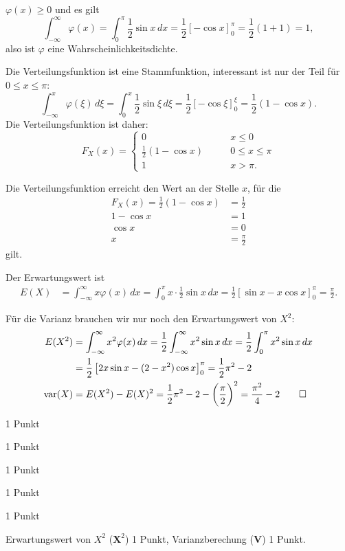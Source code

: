\begin{loesung}
\begin{teilaufgaben}
\item
$\varphi(x)\ge 0$ und es gilt
\[
\int_{-\infty}^\infty\varphi(x)=\int_0^\pi\frac12\sin x\,dx
=
\frac12\left[-\cos x\right]_0^\pi=\frac12(1+1)=1,
\]
also ist $\varphi$ eine Wahrscheinlichkeitsdichte.
\item
Die Verteilungsfunktion ist eine Stammfunktion, interessant ist nur
der Teil für $0\le x\le \pi$:
\[
\int_{-\infty}^x\varphi(\xi)\,d\xi
=
\int_0^x\frac12\sin\xi\,d\xi
=
\frac12\left[-\cos\xi\right]_0^\xi=\frac12(1-\cos x).
\]
Die Verteilungsfunktion ist daher:
\[
F_X(x)=\begin{cases}
0&\qquad x\le 0\\
\frac12(1-\cos x)&\qquad 0\le x\le \pi\\
1&\qquad x > \pi.
\end{cases}
\]
\item Die Verteilungsfunktion erreicht den Wert an der Stelle $x$, für die
\begin{align*}
F_X(x)=\frac12(1-\cos x)&=\frac12\\
1-\cos x&=1\\
\cos x&=0\\
x&=\frac{\pi}2
\end{align*}
gilt.
\item
Der Erwartungswert ist
\begin{align*}
E(X)
&=
\int_{-\infty}^\infty x\varphi(x)\,dx
=
\int_0^\pi x\cdot\frac12\sin x\,dx
=
\frac12
\left[\sin x-x\cos x\right]_0^\pi=\frac{\pi}2.
\end{align*}
\item
Für die Varianz brauchen wir nur noch den Erwartungswert von $X^2$:
\begin{align*}
E(X^2)
&=
\int_{-\infty}^\infty x^2\varphi(x)\,dx
=
\frac12\int_{-\infty}^\infty x^2\sin x\,dx
=
\frac12\int_0^\pi x^2\sin x\,dx 
\\
&=
\frac12\left[
2x\sin x-(2-x^2)\cos x
\right]_0^\pi
=
\frac12\pi^2-2
\\
\operatorname{var}(X)&=E(X^2)-E(X)^2=
\frac12\pi^2-2-\biggl(\frac{\pi}2\biggr)^2
=\frac{\pi^2}4-2
\qedhere
\end{align*}
\end{teilaufgaben}
\end{loesung}

\begin{bewertung}
\begin{teilaufgaben}
\item 1 Punkt
\item 1 Punkt
\item 1 Punkt
\item 1 Punkt
\item 1 Punkt
\item Erwartungswert von $X^2$ ($\textbf{X}^2$) 1 Punkt,
Varianzberechung (\textbf{V}) 1 Punkt.
\end{teilaufgaben}
\end{bewertung}

